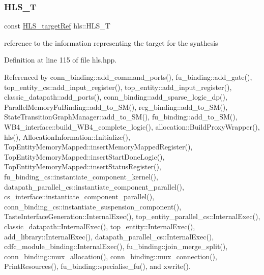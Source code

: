 \subsubsection{\texorpdfstring{H\+L\+S\+\_\+T}{HLS\_T}}
{\footnotesize\ttfamily const \hyperlink{hls__target_8hpp_a390f1d55d3b31739665ff2776abe2a3f}{H\+L\+S\+\_\+target\+Ref} hls\+::\+H\+L\+S\+\_\+T}



reference to the information representing the target for the synthesis 



Definition at line 115 of file hls.\+hpp.



Referenced by conn\+\_\+binding\+::add\+\_\+command\+\_\+ports(), fu\+\_\+binding\+::add\+\_\+gate(), top\+\_\+entity\+\_\+cs\+::add\+\_\+input\+\_\+register(), top\+\_\+entity\+::add\+\_\+input\+\_\+register(), classic\+\_\+datapath\+::add\+\_\+ports(), conn\+\_\+binding\+::add\+\_\+sparse\+\_\+logic\+\_\+dp(), Parallel\+Memory\+Fu\+Binding\+::add\+\_\+to\+\_\+\+S\+M(), reg\+\_\+binding\+::add\+\_\+to\+\_\+\+S\+M(), State\+Transition\+Graph\+Manager\+::add\+\_\+to\+\_\+\+S\+M(), fu\+\_\+binding\+::add\+\_\+to\+\_\+\+S\+M(), W\+B4\+\_\+interface\+::build\+\_\+\+W\+B4\+\_\+complete\+\_\+logic(), allocation\+::\+Build\+Proxy\+Wrapper(), hls(), Allocation\+Information\+::\+Initialize(), Top\+Entity\+Memory\+Mapped\+::insert\+Memory\+Mapped\+Register(), Top\+Entity\+Memory\+Mapped\+::insert\+Start\+Done\+Logic(), Top\+Entity\+Memory\+Mapped\+::insert\+Status\+Register(), fu\+\_\+binding\+\_\+cs\+::instantiate\+\_\+component\+\_\+kernel(), datapath\+\_\+parallel\+\_\+cs\+::instantiate\+\_\+component\+\_\+parallel(), cs\+\_\+interface\+::instantiate\+\_\+component\+\_\+parallel(), conn\+\_\+binding\+\_\+cs\+::instantiate\+\_\+suspension\+\_\+component(), Taste\+Interface\+Generation\+::\+Internal\+Exec(), top\+\_\+entity\+\_\+parallel\+\_\+cs\+::\+Internal\+Exec(), classic\+\_\+datapath\+::\+Internal\+Exec(), top\+\_\+entity\+::\+Internal\+Exec(), add\+\_\+library\+::\+Internal\+Exec(), datapath\+\_\+parallel\+\_\+cs\+::\+Internal\+Exec(), cdfc\+\_\+module\+\_\+binding\+::\+Internal\+Exec(), fu\+\_\+binding\+::join\+\_\+merge\+\_\+split(), conn\+\_\+binding\+::mux\+\_\+allocation(), conn\+\_\+binding\+::mux\+\_\+connection(), Print\+Resources(), fu\+\_\+binding\+::specialise\+\_\+fu(), and xwrite().

\mbox{\label{classhls_afc2f0f903285b792466d4b0b09e26905}} 
